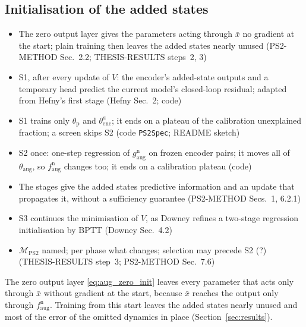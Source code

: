 \subsection{Initialisation of the added states}\label{sec:aug_ps2}
\ifdraft
\begin{itemize}
\item The zero output layer gives the parameters acting through $\bar x$ no gradient at the start; plain training then leaves the added states nearly unused (PS2-METHOD Sec.~2.2; THESIS-RESULTS steps~2, 3)
\item S1, after every update of $V$: the encoder's added-state outputs and a temporary head predict the current model's closed-loop residual; adapted from Hefny's first stage (Hefny Sec.~2; code)
\item S1 trains only $\theta_{\mathrm p}$ and $\theta^a_{\mathrm{enc}}$; it ends on a plateau of the calibration unexplained fraction; a screen skips S2 (code \texttt{PS2Spec}; README sketch)
\item S2 once: one-step regression of $g^{\mathrm n}_{\mathrm{aug}}$ on frozen encoder pairs; it moves all of $\theta_{\mathrm{aug}}$, so $f^{\mathrm n}_{\mathrm{aug}}$ changes too; it ends on a calibration plateau (code)
\item The stages give the added states predictive information and an update that propagates it, without a sufficiency guarantee (PS2-METHOD Secs.~1, 6.2.1)
\item S3 continues the minimisation of $V$, as Downey refines a two-stage regression initialisation by BPTT (Downey Sec.~4.2)
\item $\mathcal M_{\mathrm{PS2}}$ named; per phase what changes; selection may precede S2 (?) (THESIS-RESULTS step~3; PS2-METHOD Sec.~7.6)
\end{itemize}
\fi

The zero output layer \eqref{eq:aug_zero_init} leaves every parameter that acts
only through $\bar x$ without gradient at the start, because $\bar x$ reaches
the output only through $f^{\mathrm n}_{\mathrm{aug}}$.
Training from this start leaves the added states nearly unused and most of the
error of the omitted dynamics in place (Section~\ref{sec:results}).

